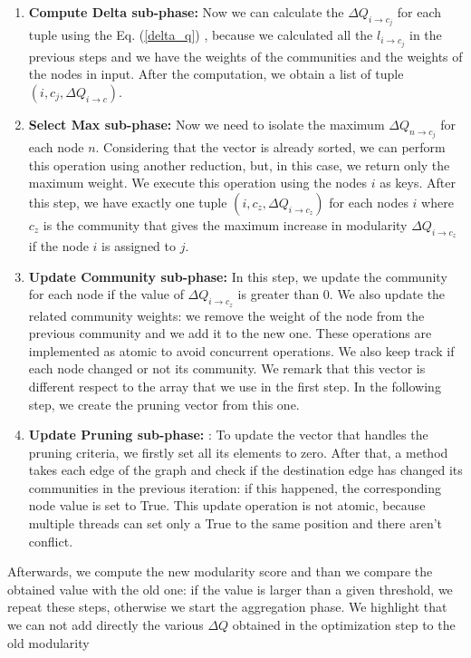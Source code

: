 \begin{enumerate}
	\item \textbf{Compute Delta sub-phase:} Now we can calculate the $\Delta Q_{i\rightarrow c_j}$ for each tuple using the Eq. (\ref{delta_q}) , because we calculated all the $l_{i\rightarrow c_j}$ in the previous steps and we have the weights of the communities and the weights of the nodes in input. After the computation, we obtain a list of tuple $(i, c_j, \Delta Q_{i\rightarrow c})$.
	
	\item \textbf{Select Max sub-phase:} Now we need to isolate the maximum $\Delta Q_{n\rightarrow c_j}$ for each node $n$. Considering that the vector is already sorted, we can perform this operation using another reduction, but, in this case, we return only the maximum weight. We execute this operation using the nodes $i$ as keys.  After this step, we have exactly one tuple  $(i, c_z, \Delta Q_{i\rightarrow c_z})$  for each nodes $i$ where $c_z$ is the community that gives the maximum increase in modularity $\Delta Q_{i\rightarrow c_z}$ if the node $i$ is assigned to $j$.
	
	\item \textbf{Update Community sub-phase:}\label{update_com} In this step, we update the community for each node if the value of $\Delta Q_{i\rightarrow c_z}$ is greater than 0. We also update the related community weights: we remove the weight of the node from the previous community and we add it to the new one. These operations are implemented as atomic to avoid concurrent operations.  We also keep track if each node changed or not its community. We remark that this
	vector is different respect to the array that we use in the first step. In the following step, we create the pruning vector from this one.

	
	\item \textbf{Update Pruning sub-phase:}\label{update_prun} : To update the vector that handles the pruning
	criteria, we firstly set all its elements to zero. After that, a method takes each
	edge of the graph and check if the destination edge has changed its communities
	in the previous iteration: if this happened, the corresponding node value is set
	to True. This update operation is not atomic, because multiple threads can
	set only a True to the same position and there aren’t conflict.

\end{enumerate}
Afterwards, we compute the new modularity score and than we compare the obtained value with the old one: if the value is larger than a given threshold, we repeat these steps, otherwise we start the aggregation phase. We highlight that we can not add directly the various $\Delta Q$ obtained in the optimization step to the old modularity
